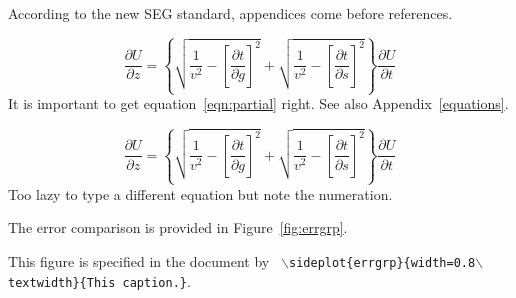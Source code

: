 \documentclass{article}
\begin{document}
According to the new SEG standard, appendices come before references.

\begin{equation}
\frac{\partial U}{\partial z} = 
\left\{
  \sqrt{\frac{1}{v^2} - \left[\frac{\partial t}{\partial g}\right]^2} +
  \sqrt{\frac{1}{v^2} - \left[\frac{\partial t}{\partial s}\right]^2}
\right\}
\frac{\partial U}{\partial t}
\label{eqn:partial}
\end{equation}
It is important to get equation~\ref{eqn:partial} right. See also
Appendix~\ref{equations}.


\begin{equation}
\frac{\partial U}{\partial z} = 
\left\{
  \sqrt{\frac{1}{v^2} - \left[\frac{\partial t}{\partial g}\right]^2} +
  \sqrt{\frac{1}{v^2} - \left[\frac{\partial t}{\partial s}\right]^2}
\right\}
\frac{\partial U}{\partial t}
\label{eqn:partial2}
\end{equation}
Too lazy to type a different equation but note the numeration.

The error comparison is provided in Figure~\ref{fig:errgrp}.

{This figure is specified in the document by \texttt{
    $\backslash$sideplot\{errgrp\}\{width=0.8$\backslash$text\-width\}\{This caption.\}}.
}







\newpage

\end{document}
